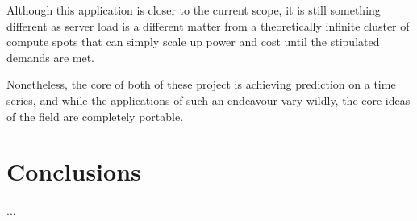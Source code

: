 \documentclass[runningheads]{llncs}
\begin{document}
Although this application is closer to the current scope, it is still something different as server load is a different matter from a theoretically infinite cluster of compute spots that can simply scale up power and cost until the stipulated demands are met. 

Nonetheless, the core of both of these project is achieving prediction on a time series, and while the applications of such an endeavour vary wildly, the core ideas of the field are completely portable.



\FloatBarrier
\section{Conclusions}

...


 
\pagebreak






%
%



\end{document}
